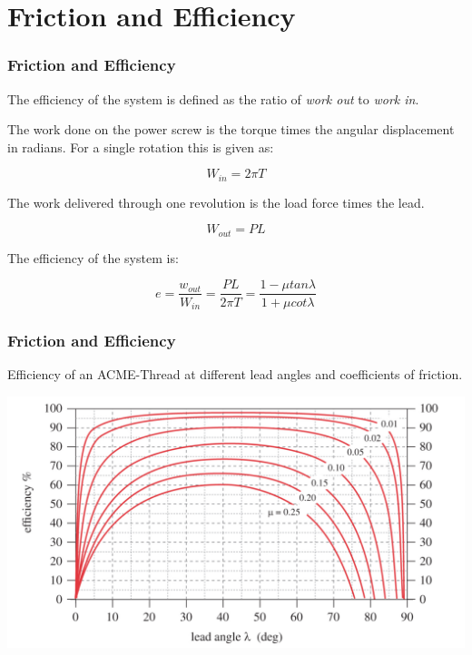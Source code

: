 \documentclass[fleqn]{beamer} %
\newcommand{\sectiontitleIV}{Friction and Efficiency}
\begin{document}
	
\section{\sectiontitleIV}	

    \begin{frame}[label=sectionIV] \small
		\frametitle{\sectiontitleIV}    

		The efficiency of the system is defined as the ratio of {\it work out} to {\it work in}. 

		The work done on the power screw is the torque times the angular displacement in radians. For a single rotation this is given as: 

		\[W_{in}=2\pi T\]

		The work delivered through one revolution is the load force times the lead.

		\[W_{out}=PL\]

		The efficiency of the system is:

		\[e=\frac{w_{out}}{W_{in}}=\frac{PL}{2\pi T} = \frac{1-\mu tan\lambda}{1+\mu cot\lambda}\]

	\end{frame}


    \begin{frame}[label=sectionIV] \small
		\frametitle{\sectiontitleIV}  	

		Efficiency of an ACME-Thread at different lead angles and coefficients of friction.

		\includegraphics[scale=.2]{images/figure_15_8.png}



	\end{frame}



		
\end{document}

